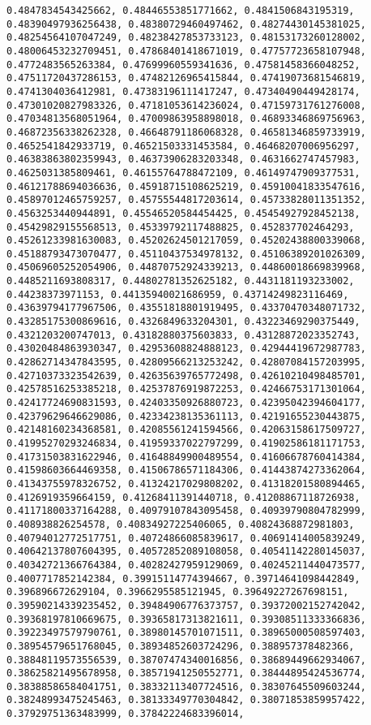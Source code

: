 \documentclass[11pt]{article}
\begin{document}
\begin{Verbatim}[commandchars=\\\{\}]
0.4847834543425662, 0.48446553851771662, 0.4841506843195319, 0.48390497936256438, 0.48380729460497462, 0.48274430145381025, 0.48254564107047249, 0.48238427853733123, 0.48153173260128002, 0.48006453232709451, 0.47868401418671019, 0.47757723658107948, 0.4772483565263384, 0.47699960559341636, 0.47581458366048252, 0.47511720437286153, 0.47482126965415844, 0.47419073681546819, 0.4741304036412981, 0.47383196111417247, 0.47340490449428174, 0.47301020827983326, 0.47181053614236024, 0.47159731761276008, 0.47034813568051964, 0.47009863958898018, 0.46893346869756963, 0.46872356338262328, 0.46648791186068328, 0.46581346859733919, 0.4652541842933719, 0.46521503331453584, 0.46468207006956297, 0.46383863802359943, 0.46373906283203348, 0.4631662747457983, 0.4625031385809461, 0.46155764788472109, 0.46149747909377531, 0.46121788694036636, 0.45918715108625219, 0.45910041833547616, 0.45897012465759257, 0.45755544817203614, 0.45733828011351352, 0.4563253440944891, 0.45546520584454425, 0.45454927928452138, 0.45429829155568513, 0.45339792117488825, 0.452837702464293, 0.45261233981630083, 0.45202624501217059, 0.45202438800339068, 0.45188793473070477, 0.45110437534978132, 0.45106389201026309, 0.45069605252054906, 0.44870752924339213, 0.44860018669839968, 0.4485211693808317, 0.44802781352625182, 0.4431181193233002, 0.44238373971153, 0.44135940021686959, 0.43714249823116469, 0.43639794177967506, 0.43551818801919495, 0.43370470348071732, 0.43285175300869616, 0.4326849633204301, 0.43223469290375449, 0.4321203200747013, 0.43182880375603833, 0.43128872023352743, 0.43020484863930347, 0.42953608824888123, 0.42944419672987783, 0.42862714347843595, 0.42809566213253242, 0.42807084157203995, 0.42710373323542639, 0.42635639765772498, 0.42610210498485701, 0.42578516253385218, 0.42537876919872253, 0.42466753171301064, 0.42417724690831593, 0.42403350926880723, 0.42395042394604177, 0.42379629646629086, 0.42334238135361113, 0.42191655230443875, 0.42148160234368581, 0.42085561241594566, 0.42063158617509727, 0.41995270293246834, 0.41959337022797299, 0.41902586181171753, 0.41731503831622946, 0.41648849900489554, 0.41606678760414384, 0.41598603664469358, 0.41506786571184306, 0.41443874273362064, 0.41343755978326752, 0.41324217029808202, 0.41318201580894465, 0.4126919359664159, 0.41268411391440718, 0.41208867118726938, 0.41171800337164288, 0.40979107843095458, 0.40939790804782999, 0.408938826254578, 0.40834927225406065, 0.40824368872981803, 0.40794012772517751, 0.40724866085839617, 0.40691414005839249, 0.40642137807604395, 0.40572852089108058, 0.40541142280145037, 0.40342721366764384, 0.40282427959129069, 0.40245211440473577, 0.4007717852142384, 0.39915114774394667, 0.39714641098442849, 0.396896672629104, 0.3966295585121945, 0.39649227267698151, 0.39590214339235452, 0.39484906776373757, 0.39372002152742042, 0.39368197810669675, 0.39365817313821611, 0.39308511333366836, 0.39223497579790761, 0.38980145701071511, 0.38965000508597403, 0.38954579651768045, 0.38934852603724296, 0.388957378482366, 0.38848119573556539, 0.38707474340016856, 0.38689449662934067, 0.38625821495678958, 0.38571941250552771, 0.38444895424536774, 0.38388586584041751, 0.38332113407724516, 0.38307645509603244, 0.38248993475245463, 0.38133349770304842, 0.38071853859957422, 0.37929751363483999, 0.37842224683396014, 
\end{Verbatim}
\end{document}
